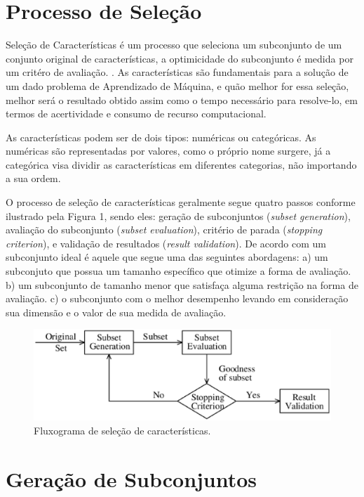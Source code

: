 \section{Processo de Seleção}

Seleção de Características é um processo que seleciona um subconjunto de um conjunto original de características, a optimicidade do subconjunto é medida por um critéro de avaliação. \cite{liu_2005}. As características são fundamentais para a solução de um dado problema de Aprendizado de Máquina, e quão melhor for essa seleção, melhor será o resultado obtido assim como o tempo necessário para resolve-lo, em termos de acertividade e consumo de recurso computacional. 

As características podem ser de dois tipos: numéricas ou categóricas. As numéricas são representadas por valores, como o próprio nome surgere, já a categórica visa dividir as características em diferentes categorias, não importando a sua ordem. 

O processo de seleção de características geralmente segue quatro passos conforme ilustrado pela Figura 1, sendo eles: geração de subconjuntos (\textit {subset generation}), avaliação do subconjunto (\textit {subset evaluation}), critério de parada (\textit {stopping criterion}), e validação de resultados (\textit {result validation}). De acordo com  um subconjunto ideal é aquele que segue uma das seguintes abordagens: a) um subconjuto que possua um tamanho específico que otimize a forma de avaliação. b) um subconjunto de tamanho menor que satisfaça alguma restrição na forma de avaliação. c) o subconjunto com o melhor desempenho levando em consideração sua dimensão e o valor de sua medida de avaliação.

\begin{figure}[h]
	\centering
	\label{fig02}
		\includegraphics[keepaspectratio=true,scale=0.6]{figuras/fig02.eps}
	\caption{Fluxograma de seleção de características. \cite{liu_2005}}
\end{figure}

\section{Geração de Subconjuntos}

